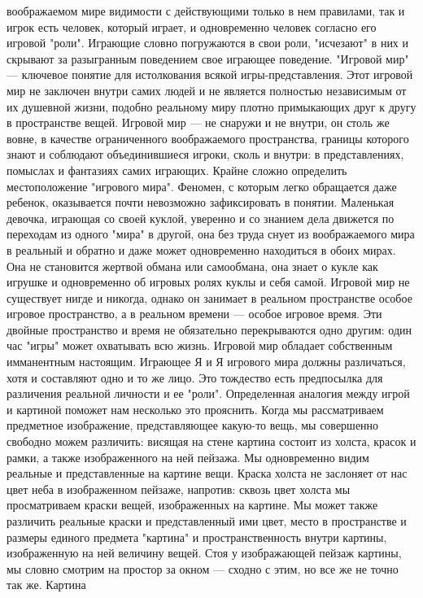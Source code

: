 \documentclass[12pt]{article}
\begin{document}
воображаемом мире видимости с действующими только в нем правилами, так и игрок есть человек, который
играет, и одновременно человек согласно его игровой "роли". Играющие словно погружаются в свои роли,
"исчезают" в них и скрывают за разыгранным поведением свое играющее поведение.
"Игровой мир" --- ключевое понятие для истолкования всякой
игры-представления. Этот игровой мир не заключен внутри самих людей и не является полностью независимым
от их душевной жизни, подобно реальному миру плотно примыкающих друг к другу в пространстве вещей.
Игровой  мир  ---  не  снаружи  и  не  внутри,  он  столь  же  вовне,  в  качестве  ограниченного  воображаемого
пространства, границы которого знают и соблюдают объединившиеся игроки, сколь и внутри: в представлениях,
помыслах  и  фантазиях  самих  играющих.  Крайне  сложно  определить  местоположение  "игрового  мира".
Феномен, с которым легко обращается даже ребенок, оказывается почти невозможно зафиксировать в понятии.
Маленькая девочка, играющая со своей куклой, уверенно и со знанием дела
движется по переходам из одного "мира" в другой, она без труда снует из воображаемого мира в реальный и
обратно  и  даже  может  одновременно  находиться  в  обоих  мирах.  Она  не  становится  жертвой  обмана  или
самообмана, она знает о кукле как игрушке и одновременно об игровых ролях куклы и себя самой. Игровой мир
не существует нигде и никогда, однако он занимает в реальном пространстве особое игровое пространство, а в
реальном времени --- особое игровое время. Эти двойные пространство и время не обязательно перекрываются
одно другим: один час "игры" может охватывать всю жизнь. Игровой мир обладает собственным имманентным
настоящим. Играющее Я и Я игрового мира должны различаться, хотя и составляют одно и то же лицо. Это
тождество есть предпосылка для различения реальной личности и ее "роли". Определенная аналогия между
игрой и картиной поможет нам несколько это прояснить. Когда мы рассматриваем предметное изображение,
представляющее какую-то вещь, мы совершенно свободно можем различить: висящая на стене картина состоит
из  холста,  красок и рамки,  а также изображенного  на ней пейзажа.  Мы одновременно  видим реальные  и
представленные на картине  вещи. Краска холста  не  заслоняет от  нас цвет неба  в  изображенном пейзаже,
напротив: сквозь цвет холста мы просматриваем краски вещей, изображенных на картине. Мы может также
различить реальные краски и представленный ими цвет, место в пространстве и размеры единого предмета 
"картина" и пространственность внутри картины, изображенную на ней величину вещей. Стоя у изображающей
пейзаж картины, мы словно смотрим на простор за окном --- сходно с этим, но все же не точно так же. Картина
\end{document}
